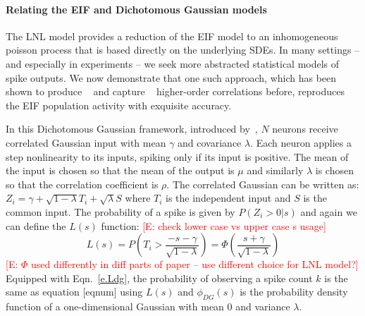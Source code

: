 \documentclass[%
 reprint,
 twocolumn,
 amsmath,amssymb,
 aps,
floatfix,
]{revtex4}
\newcommand{\Ecomment}[1]{\textcolor{red}{[E: #1]}}
\begin{document}
%
%




\paragraph*{Relating the EIF and Dichotomous Gaussian models}

The LNL model provides a reduction of the EIF model to an inhomogeneous poisson process that is based directly on the underlying SDEs.  In many settings -- and especially in experiments -- we seek more abstracted statistical models of spike outputs.  We now demonstrate that one such approach, which has been shown to produce ~\cite{Amari,Macke} and capture ~\cite{Yu} higher-order correlations before, reproduces the EIF population activity with exquisite accuracy.  

In this Dichotomous Gaussian framework, introduced by~\cite{Amari,Macke}, $N$ neurons receive correlated Gaussian input with mean $\gamma$ and covariance $\lambda$. Each neuron applies a step nonlinearity to its inputs, spiking only if its input is positive. The mean of the input is chosen so that the mean of the output is $\mu$ and similarly $\lambda$ is chosen so that the correlation coefficient is $\rho$.
The correlated Gaussian can be written as: $Z_i = \gamma + \sqrt{1-\lambda} T_i + \sqrt{\lambda} S$ where $T_i$ is the independent input and $S$ is the common input. The probability of a spike is given by $P(Z_i > 0 | s)$ and again we can define the $L(s)$ function:  \Ecomment{check lower case vs upper case s usage}
\begin{equation}
L(s) = P\left( T_i > \frac{-s-\gamma}{\sqrt{1-\lambda}} \right) = \Phi\left(\frac{s+\gamma}{\sqrt{1-\lambda}}\right)
\label{e.Ldg}
\end{equation}
\Ecomment{$\Phi$ used differently in diff parts of paper -- use different choice for LNL model?}
Equipped with Eqn.~\eqref{e.Ldg}, the probability of observing a spike count $k$ is the same as equation [eqnum] using $L(s)$ and $\phi_{DG}(s)$ is the probability density function of a one-dimensional Gaussian with mean $0$ and variance $\lambda$.
\end{document}
